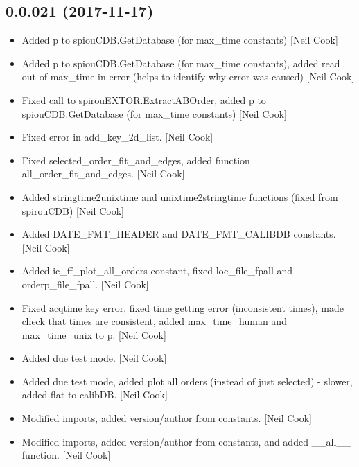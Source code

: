 \documentclass[a4paper,10pt,english]{report}
\begin{document}
\subsection{0.0.021 (2017-11-17)}
\label{\detokenize{misc/changelog:id528}}\begin{itemize}
\item {} 
Added p to spiouCDB.GetDatabase (for max\_time constants) {[}Neil Cook{]}

\item {} 
Added p to spiouCDB.GetDatabase (for max\_time constants), added read
out of max\_time in error (helps to identify why error was caused)
{[}Neil Cook{]}

\item {} 
Fixed call to spirouEXTOR.ExtractABOrder, added p to
spiouCDB.GetDatabase (for max\_time constants) {[}Neil Cook{]}

\item {} 
Fixed error in add\_key\_2d\_list. {[}Neil Cook{]}

\item {} 
Fixed selected\_order\_fit\_and\_edges, added function
all\_order\_fit\_and\_edges. {[}Neil Cook{]}

\item {} 
Added stringtime2unixtime and unixtime2stringtime functions (fixed
from spirouCDB) {[}Neil Cook{]}

\item {} 
Added DATE\_FMT\_HEADER and DATE\_FMT\_CALIBDB constants. {[}Neil Cook{]}

\item {} 
Added ic\_ff\_plot\_all\_orders constant, fixed loc\_file\_fpall and
orderp\_file\_fpall. {[}Neil Cook{]}

\item {} 
Fixed acqtime key error, fixed time getting error (inconsistent
times), made check that times are consistent, added max\_time\_human and
max\_time\_unix to p. {[}Neil Cook{]}

\item {} 
Added due test mode. {[}Neil Cook{]}

\item {} 
Added due test mode, added plot all orders (instead of just selected)
- slower, added flat to calibDB. {[}Neil Cook{]}

\item {} 
Modified imports, added version/author from constants. {[}Neil Cook{]}

\item {} 
Modified imports, added version/author from constants, and added
\_\_all\_\_ function. {[}Neil Cook{]}


\end{itemize}
\end{document}
